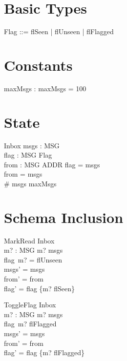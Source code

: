 \documentclass{article}
\begin{document}
\section{Basic Types}

\begin{zed}
\end{zed}

\begin{zed}
  Flag ::= flSeen | flUnseen | flFlagged
\end{zed}

\section{Constants}

\begin{axdef}
  maxMsgs : \nat
\where
  maxMsgs = 100
\end{axdef}

\section{State}

\begin{schema}{Inbox}
  msgs : \power MSG \\
  flag : MSG \pfun Flag \\
  from : MSG \pfun ADDR
\where
  \dom flag = msgs \\
  \dom from = msgs \\
  \# msgs \leq maxMsgs
\end{schema}

\section{Schema Inclusion}

\begin{schema}{MarkRead}
  \Delta Inbox \\
  m? : MSG
\where
  m? \in msgs \\
  flag~m? = flUnseen \\
  msgs' = msgs \\
  from' = from \\
  flag' = flag \oplus \{m? \mapsto flSeen\}
\end{schema}

\begin{schema}{ToggleFlag}
  \Delta Inbox \\
  m? : MSG
\where
  m? \in msgs \\
  flag~m? \neq flFlagged \\
  msgs' = msgs \\
  from' = from \\
  flag' = flag \oplus \{m? \mapsto flFlagged\}
\end{schema}
\end{document}
